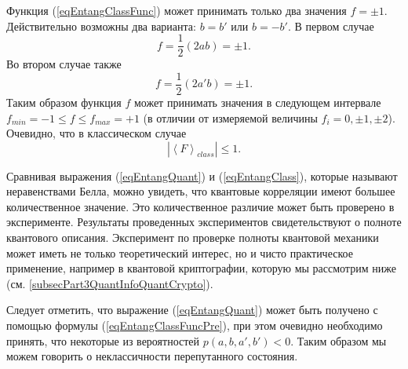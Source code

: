 Функция (\ref{eqEntangClassFunc}) может принимать только два значения
$f = \pm 1$. Действительно возможны два варианта: $b = b'$ или $b = - b'$. В
первом случае 
\[
f = \frac{1}{2}\left(2ab\right) = \pm 1.
\]
Во втором случае также 
\[
f = \frac{1}{2}\left(2a'b\right) = \pm 1.
\]
Таким образом функция $f$ может принимать значения в следующем
интервале $f_{min} = -1 \le f \le f_{max} = +1$ (в отличии от измеряемой величины
$f_i = 0, \pm 1, \pm 2$). Очевидно, что в классическом случае
\begin{equation}
\left|\left<F\right>_{class} \right| 
\le 1.
\label{eqEntangClass}
\end{equation}

Сравнивая выражения (\ref{eqEntangQuant}) и (\ref{eqEntangClass}),
которые называют неравенствами Белла,
можно увидеть, что квантовые корреляции имеют большее количественное
значение. Это количественное различие может быть проверено в
эксперименте. Результаты проведенных экспериментов свидетельствуют о
полноте квантового описания. Эксперимент по проверке полноты квантовой
механики может иметь не только теоретический интерес, но и чисто
практическое применение, например в квантовой криптографии, которую мы
рассмотрим ниже (см. \ref{subsecPart3QuantInfoQuantCrypto}). 

Следует отметить, что выражение (\ref{eqEntangQuant}) может быть
получено с помощью формулы  (\ref{eqEntangClassFuncPre}), при этом
очевидно необходимо принять, что некоторые из вероятностей
$p\left(a,b,a',b'\right) < 0$. Таким образом мы можем говорить о
неклассичности перепутанного состояния.  
